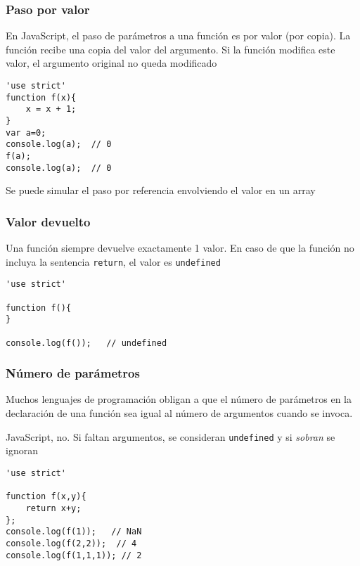 \documentclass[ucs]{beamer}
\begin{document}
\begin{frame}[fragile]
\frametitle{Paso por valor}
En JavaScript, el paso de parámetros a una función es por valor (por copia).
La función recibe una copia del valor del argumento. Si la función modifica este
valor, el argumento original no queda modificado

  \begin{scriptsize}
  \begin{verbatim}
'use strict'
function f(x){
    x = x + 1;
}
var a=0;
console.log(a);  // 0 
f(a);
console.log(a);  // 0
  \end{verbatim}
  \end{scriptsize}

Se puede simular el paso por referencia envolviendo el valor en un array
\end{frame}

\begin{frame}[fragile]
\frametitle{Valor devuelto}

Una función siempre devuelve exactamente 1 valor. En caso de que 
la función no incluya la sentencia
\verb|return|,
el valor es
\verb|undefined|


  \begin{scriptsize}
  \begin{verbatim}
'use strict'

function f(){
}

console.log(f());   // undefined
  \end{verbatim}
  \end{scriptsize}

\end{frame}

\begin{frame}[fragile]
\frametitle{Número de parámetros}
Muchos lenguajes de programación obligan a que el número
de parámetros en la declaración de una función sea igual al número
de argumentos cuando se invoca.

JavaScript, no. 
Si faltan argumentos, se consideran \verb|undefined|
y si \emph{sobran} se ignoran 


  \begin{scriptsize}
  \begin{verbatim}
'use strict'

function f(x,y){
    return x+y;
};
console.log(f(1));   // NaN
console.log(f(2,2));  // 4
console.log(f(1,1,1)); // 2


  \end{verbatim}
  \end{scriptsize}


\end{frame}
\end{document}
